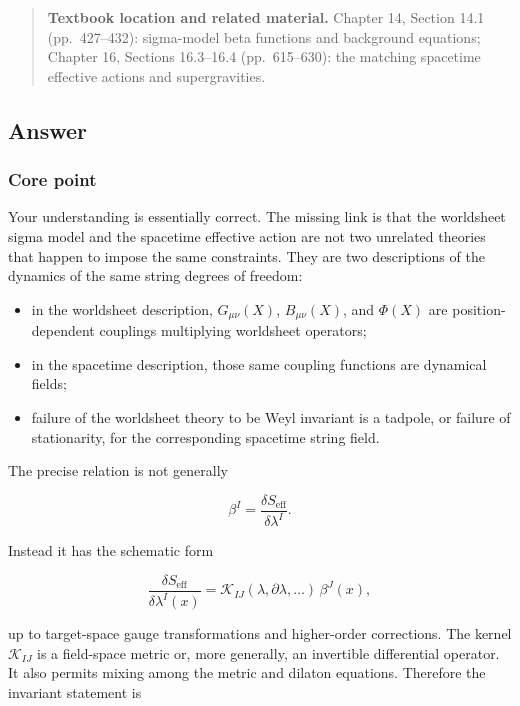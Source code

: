 \documentclass[
  10pt,
  a4paper,
  openany]{book}
\providecommand{\tightlist}{%
  \setlength{\itemsep}{0pt}\setlength{\parskip}{0pt}}
\begin{document}
\begin{quote}
\textbf{Textbook location and related material.} Chapter 14, Section
14.1 (pp.~427--432): sigma-model beta functions and background
equations; Chapter 16, Sections 16.3--16.4 (pp.~615--630): the matching
spacetime effective actions and supergravities.
\end{quote}

\subsection{Answer}\label{answer-33}

\subsubsection{Core point}\label{core-point-33}

Your understanding is essentially correct. The missing link is that the
worldsheet sigma model and the spacetime effective action are not two
unrelated theories that happen to impose the same constraints. They are
two descriptions of the dynamics of the same string degrees of freedom:

\begin{itemize}
\tightlist
\item
  in the worldsheet description, \(G_{\mu\nu}(X)\), \(B_{\mu\nu}(X)\),
  and \(\Phi(X)\) are position-dependent couplings multiplying
  worldsheet operators;
\item
  in the spacetime description, those same coupling functions are
  dynamical fields;
\item
  failure of the worldsheet theory to be Weyl invariant is a tadpole, or
  failure of stationarity, for the corresponding spacetime string field.
\end{itemize}

The precise relation is not generally

\[
\beta^I=\frac{\delta S_{\mathrm{eff}}}{\delta\lambda^I}.
\]

Instead it has the schematic form

\[
\boxed{
\frac{\delta S_{\mathrm{eff}}}{\delta\lambda^I(x)}
=\mathcal K_{IJ}(\lambda,\partial\lambda,\ldots)\,
\beta^J(x),
}
\]

up to target-space gauge transformations and higher-order corrections.
The kernel \(\mathcal K_{IJ}\) is a field-space metric or, more
generally, an invertible differential operator. It also permits mixing
among the metric and dilaton equations. Therefore the invariant
statement is
\end{document}
